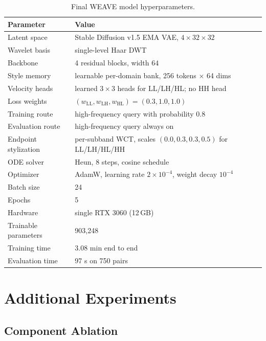 \documentclass[10pt,letterpaper]{article}
\begin{document}
\begin{table}[h]
\centering
\caption{Final WEAVE model hyperparameters.}
\label{tab:hyper}
\small
\begin{tabular}{@{}ll@{}}
\toprule
Parameter & Value \\
\midrule
Latent space & Stable Diffusion v1.5 EMA VAE, $4 \times 32 \times 32$ \\
Wavelet basis & single-level Haar DWT \\
Backbone & 4 residual blocks, width $64$ \\
Style memory & learnable per-domain bank, 256 tokens $\times$ 64 dims \\
Velocity heads & learned $3\times3$ heads for LL/LH/HL; no HH head \\
Loss weights & $(w_{\mathrm{LL}},w_{\mathrm{LH}},w_{\mathrm{HL}})=(0.3,1.0,1.0)$ \\
Training route & high-frequency query with probability $0.8$ \\
Evaluation route & high-frequency query always on \\
Endpoint stylization & per-subband WCT, scales $(0.0,0.3,0.3,0.5)$ for LL/LH/HL/HH \\
ODE solver & Heun, 8 steps, cosine schedule \\
Optimizer & AdamW, learning rate $2\times10^{-4}$, weight decay $10^{-4}$ \\
Batch size & 24 \\
Epochs & 5 \\
Hardware & single RTX 3060 (12\,GB) \\
Trainable parameters & 903{,}248 \\
Training time & 3.08 min end to end \\
Evaluation time & 97 s on 750 pairs \\
\bottomrule
\end{tabular}
\end{table}

\section{Additional Experiments}
\label{sec:additional_exp}

\subsection{Component Ablation}
\label{sec:ablation}
\end{document}

